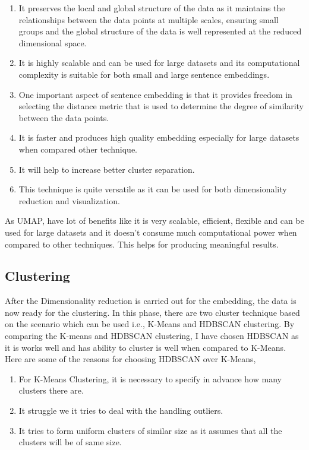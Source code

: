 \begin{enumerate}
    \item  It preserves the local and global structure of the data as it maintains the relationships between the data points
    at multiple scales, ensuring small groups and the global structure of the data is well represented at the reduced dimensional space.
    \item It is highly scalable and can be used for large datasets and its computational complexity is suitable for both small 
    and large sentence embeddings.
    \item One important aspect of sentence embedding is that it provides freedom in selecting the distance metric that is 
    used to determine the degree of similarity between the data points.
    \item It is faster and produces high quality embedding especially for large datasets when compared other technique.
    \item It will help to increase better cluster separation.
    \item This technique is quite versatile as it can be used for both dimensionality reduction and visualization.
\end{enumerate}

As UMAP, have lot of benefits like it is very scalable, efficient, flexible and can be used for large datasets and 
it doesn't consume much computational power when compared to other techniques.
This helps for producing meaningful results. 
\subsection{Clustering}

After the Dimensionality reduction is carried out for the embedding, the data is now ready for the clustering. In this phase, there are two cluster technique based on the scenario which can be used i.e., K-Means and HDBSCAN clustering.
By comparing the K-means and HDBSCAN clustering, I have chosen HDBSCAN as it is works well and has ability to cluster is well when compared to K-Means. Here are some of the reasons for choosing HDBSCAN over K-Means, 

\begin{enumerate}
    \item For K-Means Clustering, it is necessary to specify in advance how many clusters there are.
    \item It struggle we it tries to deal with the handling outliers.
    \item It tries to form uniform clusters of similar size as it assumes that all the clusters will be of same size.
\end{enumerate}

